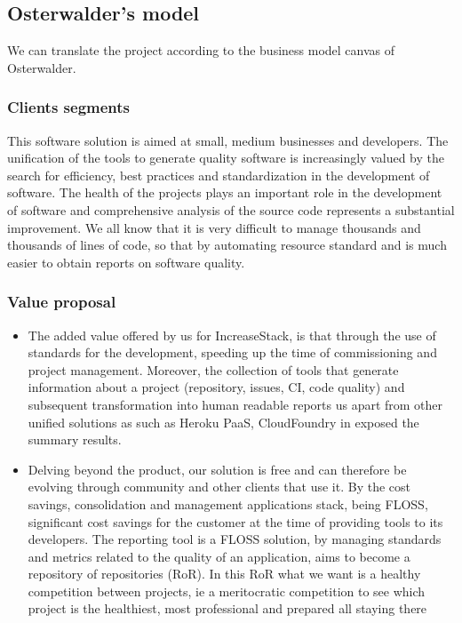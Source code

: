 \documentclass[11pt]{scrartcl}
\begin{document}
\subsection{Osterwalder's model}

\par We can translate the project according to the business model canvas of Osterwalder.

\subsubsection{Clients segments}

This software solution is aimed at small, medium businesses and developers. The unification of the tools to generate quality software is increasingly valued by the search for efficiency, best practices and standardization in the development of software. The health of the projects plays an important role in the development of software and comprehensive analysis of the source code represents a substantial improvement. We all know that it is very difficult to manage thousands and thousands of lines of code, so that by automating resource standard and is much easier to obtain reports on software quality.
    
\subsubsection{Value proposal}
    
        \begin{itemize}
            \item The added value offered by us for IncreaseStack, is that through the use of standards for the development, speeding up the time of commissioning and project management. Moreover, the collection of tools that generate information about a project (repository, issues, CI, code quality) and subsequent transformation into human readable reports us apart from other unified solutions as such as Heroku PaaS, CloudFoundry in exposed the summary results.
            \item Delving beyond the product, our solution is free and can therefore be evolving through community and other clients that use it. By the cost savings, consolidation and management applications stack, being FLOSS, significant cost savings for the customer at the time of providing tools to its developers. The reporting tool is a FLOSS solution, by managing standards and metrics related to the quality of an application, aims to become a repository of repositories (RoR). In this RoR what we want is a healthy competition between projects, ie a meritocratic competition to see which project is the healthiest, most professional and prepared all staying there
        \end{itemize}
\end{document}
